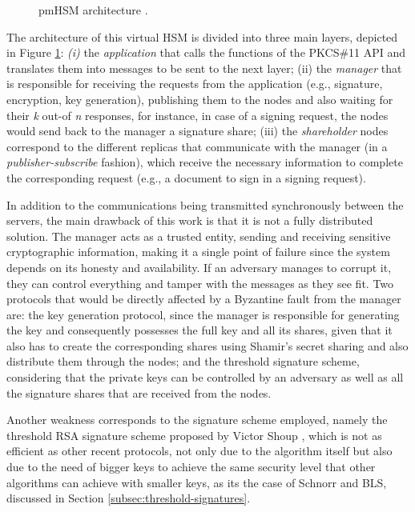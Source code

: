 \begin{figure}[h]
    \begin{center}
    \end{center}
    \caption{pmHSM architecture \cite{pmhsm}.}
    \label{fig:3.pmhsm-arch}
\end{figure}

The architecture of this virtual HSM is divided into three main layers, depicted in Figure \ref{fig:3.pmhsm-arch}: \textit{(i)} the \textit{application} that calls the functions of the PKCS\#11 API and translates them into messages to be sent to the next layer; (ii) the \textit{manager} that is responsible for receiving the requests from the application (e.g., signature, encryption, key generation), publishing them to the nodes and also waiting for their \textit{k} out-of \textit{n} responses, for instance, in case of a signing request, the nodes would send back to the manager a signature share; (iii) the \textit{shareholder} nodes correspond to the different replicas that communicate with the manager (in a \textit{publisher-subscribe} fashion), which receive the necessary information to complete the corresponding request (e.g., a document to sign in a signing request). 

In addition to the communications being transmitted synchronously between the servers, the main drawback of this work is that it is not a fully distributed solution. The manager acts as a trusted entity, sending and receiving sensitive cryptographic information, making it a single point of failure since the system depends on its honesty and availability. If an adversary manages to corrupt it, they can control everything and tamper with the messages as they see fit. Two protocols that would be directly affected by a Byzantine fault from the manager are: the key generation protocol, since the manager is responsible for generating the key and consequently possesses the full key and all its shares, given that it also has to create the corresponding shares using Shamir's secret sharing and also distribute them through the nodes; and the threshold signature scheme, considering that the private keys can be controlled by an adversary as well as all the signature shares that are received from the nodes.

Another weakness corresponds to the signature scheme employed, namely the threshold RSA signature scheme proposed by Victor Shoup \cite{practicalthresholdsignatures}, which is not as efficient as other recent protocols, not only due to the algorithm itself but also due to the need of bigger keys to achieve the same security level that other algorithms can achieve with smaller keys, as its the case of Schnorr and BLS, discussed in Section \ref{subsec:threshold-signatures}.

